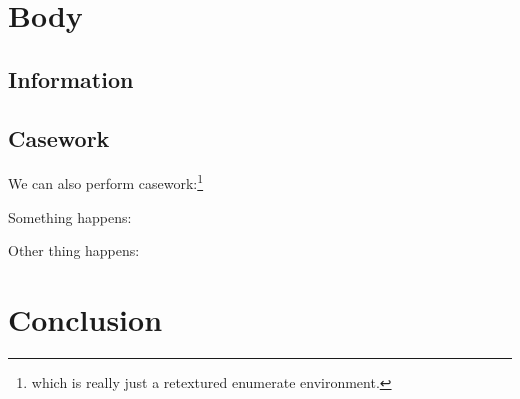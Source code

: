 \documentclass{article}
\begin{document}
\lipsum[4-4]

\section{Body}

\subsection{Information}
\lipsum[49-52]

\subsection{Casework}
We can also perform casework:\footnote{which is really just a retextured enumerate environment.}
\begin{casework}
    \item Something happens: \lipsum[6-6]
    \item Other thing happens: \lipsum[5-5]
\end{casework}

\section{Conclusion}
\lipsum[7-7]
\end{document}

